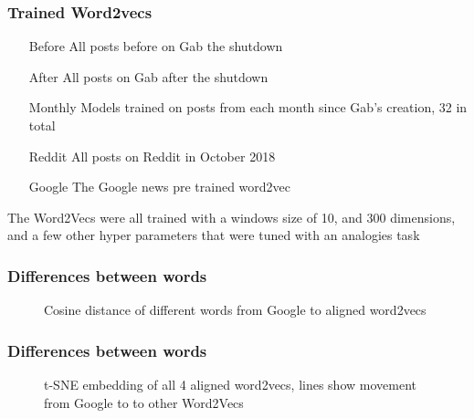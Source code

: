 \documentclass{beamer}
\begin{document}
\begin{frame}
\frametitle{Trained Word2vecs}
\begin{itemize}
	\item[Before] All posts before on Gab the shutdown 
	\item[After] All posts on Gab after the shutdown
	\item[Monthly] Models trained on posts from each month since Gab's creation, 32 in total
	\item[Reddit] All posts on Reddit in October 2018
	\item[Google] The Google news pre trained word2vec
\end{itemize}
The Word2Vecs were all trained with a windows size of 10, and 300 dimensions, and a few  other hyper parameters that were tuned with an analogies task
\end{frame}	

\begin{frame}
\frametitle{Differences between words}
\begin{figure}
	\centering
	\caption{Cosine distance of different words from Google to aligned word2vecs}
\end{figure}
\end{frame}	

\begin{frame}
\frametitle{Differences between words}
\begin{figure}
	\centering
	\caption{t-SNE embedding of all 4 aligned word2vecs, lines show movement from Google to to other Word2Vecs}
\end{figure}
\end{frame}	
\end{document}
